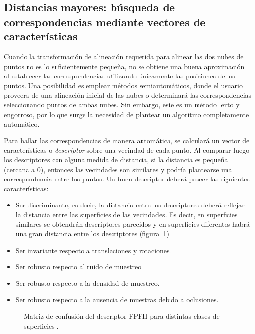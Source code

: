 \subsection{Distancias mayores: búsqueda de correspondencias mediante vectores de características}
Cuando la transformación de alineación requerida para alinear las dos nubes de puntos
no es lo suficientemente pequeña, no se obtiene una buena aproximación al establecer las correspondencias
utilizando únicamente las posiciones de los puntos.
Una posibilidad es emplear métodos semiautomáticos, donde el usuario proveerá de una alineación inicial
de las nubes o determinará las correspondencias seleccionando puntos de ambas nubes.
Sin embargo, este es un método lento y engorroso,
por lo que surge la necesidad de plantear un algoritmo completamente automático.

Para hallar las correspondencias de manera automática, se calculará un vector de características o \emph{descriptor}
sobre una vecindad de cada punto. Al comparar luego los descriptores con alguna medida de distancia,
si la distancia es pequeña (cercana a $0$), entonces las vecindades son similares
y podría plantearse una correspondencia entre los puntos.
Un buen descriptor deberá poseer las siguientes características:
\begin{itemize}
	\item Ser discriminante, es decir, la distancia entre los descriptores deberá reflejar
		la distancia entre las superficies de las vecindades.
		Es decir, en superficies similares se obtendrán descriptores parecidos y
		en superficies diferentes habrá una gran distancia entre los descriptores (figura~\ref{fig:descriptor_matriz_confusion}).
	\item Ser invariante respecto a translaciones y rotaciones.
	\item Ser robusto respecto al ruido de muestreo.
	\item Ser robusto respecto a la densidad de muestreo.
	\item Ser robusto respecto a la ausencia de muestras debido a oclusiones.
\end{itemize}

\begin{figure}
	\caption{\label{fig:descriptor_matriz_confusion}Matriz de confusión del descriptor FPFH para distintas clases de superficies .}
\end{figure}

